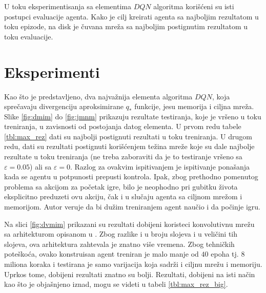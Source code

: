 \par 
U toku eksperimentisanja sa elementima $DQN$ algoritma korišćeni su isti postupci evaluacije agenta. Kako je cilj kreirati agenta sa najboljim rezultatom u toku epizode, na disk je čuvana mreža sa najboljim postignutim rezultatom u toku evaluacije.

\section{Eksperimenti}
\label{sec:eksperimenti}
Kao što je predstavljeno, dva najvažnija elementa algoritma $DQN$, koja sprečavaju divergenciju aproksimirane $q_*$ funkcije, jesu memorija i ciljna mreža. Slike \ref{fig:dmim} do \ref{fig:jmnm} prikazuju rezultate testiranja, koje je vršeno u toku treniranja, u zavisnosti od postojanja datog elementa. U prvom redu tabele \ref{tbl:max_rez} dati su najbolji postignuti rezultati u toku treniranja. U drugom redu, dati su rezultati postignuti korišćenjem težina mreže koje su dale najbolje rezultate u toku treniranja (ne treba zaboraviti da je to testiranje vršeno sa $\varepsilon = 0.05$) ali sa $\varepsilon = 0$. Razlog za ovakvim ispitivanjem je ispitivanje ponašanja kada se agentu u potpunosti prepusti kontrola. Ipak, zbog prethodno pomenutog problema sa akcijom za početak igre, bilo je neophodno pri gubitku života eksplicitno preduzeti ovu akciju, čak i u slučaju agenta sa ciljnom mrežom i memorijom. Autor veruje da bi dužim treniranjem agent naučio i da počinje igru.
\par 
Na slici \ref{fig:dvmim} prikazani su rezultati dobijeni koristeci konvolutivnu mrežu sa arhitekturom opisanom u \cite{dqn_dm}. Zbog razlike i u broju slojeva i u veličini tih slojeva, ova arhitektura zahtevala je znatno više vremena. Zbog tehničkih poteškoća, ovako konstruisan agent treniran je malo manje od $40$ epoha tj. $8$ miliona koraka i testirana je samo varijacija koja sadrži i ciljnu mrežu i memoriju. Uprkos tome, dobijeni rezultati znatno su bolji. Rezultati, dobijeni na isti način kao što je objašnjeno iznad, mogu se videti u tabeli \ref{tbl:max_rez_big}.

